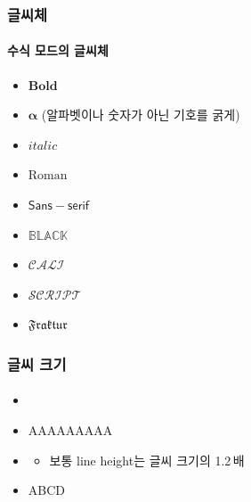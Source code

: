   \begin{frame}[fragile]
    \frametitle{글씨체}
    \framesubtitle{수식 모드의 글씨체}
    \begin{itemize}
      \item \texttt{} $\mathbf{Bold}$
      \item \texttt{\boldsymbol{\alpha}} $\boldsymbol{\alpha}$ (알파벳이나 숫자가 아닌 기호를 굵게)
      \item \texttt{} $\mathit{italic}$
      \item \texttt{} $\mathrm{Roman}$
      \item \texttt{} $\mathsf{Sans-serif}$
      \item \texttt{} $\mathbb{BLACK}$
      \item \texttt{} $\mathcal{CALI}$
      \item \texttt{} $\mathscr{SCRIPT}$
      \item \texttt{} $\mathfrak{Fraktur}$
    \end{itemize}
  \end{frame}
  
  \begin{frame}[fragile]
    \frametitle{글씨 크기}
    \framesubtitle{}
    \begin{itemize}
      \item \texttt{\tiny \scriptsize \footnotesize \small \normalsize} \texttt{\large \Large \LARGE \huge \Huge}
      \item {\tiny A\scriptsize A\footnotesize A\small A\normalsize A\large A\Large A\LARGE A\huge A\Huge}
      \item \texttt{\fontsize{글씨 크기}{line height}\selectfont}
      \begin{itemize}
        \item 보통 line height는 글씨 크기의 1.2\,배
      \end{itemize}
      \item {\fontsize{60}{72}\selectfont A\fontsize{30}{36}\selectfont B\fontsize{50}{72}\selectfont C\fontsize{80}{86}\selectfont D}
    \end{itemize}
  \end{frame}
  

